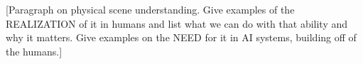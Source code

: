 







[Paragraph on physical scene understanding. Give examples of the REALIZATION of it in humans and list what we can do with that ability and why it matters. Give examples on the NEED for it in AI systems, building off of the humans.]
% 

